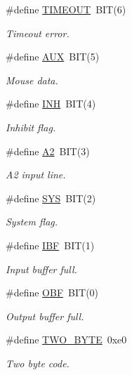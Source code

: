 \begin{DoxyCompactItemize}
\#define \hyperlink{group__Keyboard_ga45ba202b05caf39795aeca91b0ae547e}{T\+I\+M\+E\+O\+UT}~B\+IT(6)
\begin{DoxyCompactList}\small\item\em Timeout error. \end{DoxyCompactList}\item 
\#define \hyperlink{group__Keyboard_ga1b41fd2be63532d4ab910f8b256c3811}{A\+UX}~B\+IT(5)
\begin{DoxyCompactList}\small\item\em Mouse data. \end{DoxyCompactList}\item 
\#define \hyperlink{group__Keyboard_ga03f542f1e0e2ba512c4ed189decfee3d}{I\+NH}~B\+IT(4)
\begin{DoxyCompactList}\small\item\em Inhibit flag. \end{DoxyCompactList}\item 
\#define \hyperlink{group__Keyboard_ga2946bc30423c2a996eeafa49e995c30e}{A2}~B\+IT(3)
\begin{DoxyCompactList}\small\item\em A2 input line. \end{DoxyCompactList}\item 
\#define \hyperlink{group__Keyboard_gae3d9f52a1a315303ad04f0576bd42a25}{S\+YS}~B\+IT(2)
\begin{DoxyCompactList}\small\item\em System flag. \end{DoxyCompactList}\item 
\#define \hyperlink{group__Keyboard_ga3c48b10907056351582baf9f6478598e}{I\+BF}~B\+IT(1)
\begin{DoxyCompactList}\small\item\em Input buffer full. \end{DoxyCompactList}\item 
\#define \hyperlink{group__Keyboard_ga45967c9e25447ba853cf6fb4ac545fe6}{O\+BF}~B\+IT(0)
\begin{DoxyCompactList}\small\item\em Output buffer full. \end{DoxyCompactList}\item 
\#define \hyperlink{group__Keyboard_ga7f9aacad98586d9a60c8d16b6f5435f4}{T\+W\+O\+\_\+\+B\+Y\+TE}~0xe0
\begin{DoxyCompactList}\small\item\em Two byte code. \end{DoxyCompactList}\item 

\end{DoxyCompactItemize}
